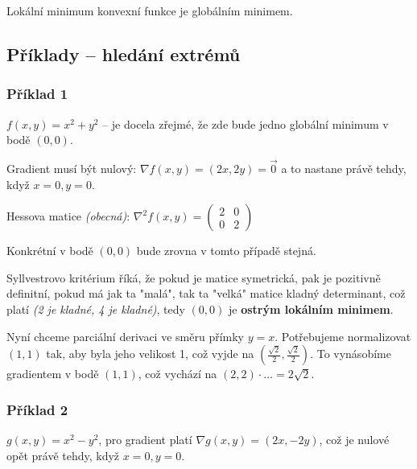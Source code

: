 \vspace{4pt}
\noindent Lokální minimum konvexní funkce je globálním minimem.

\subsection{Příklady -- hledání extrémů}

\subsubsection*{Příklad 1}

$f(x,y) = x^2 + y^2$ -- je docela zřejmé, že zde bude jedno globální minimum v bodě $(0,0)$.

\vspace{4pt}
\noindent Gradient musí být nulový: $\nabla f(x,y) = (2x, 2y) = \vec{0}$ a to nastane právě tehdy, když $x = 0, y = 0$.

\vspace{4pt}
\noindent 
Hessova matice \textit{(obecná)}: $\nabla^2 f(x, y) = \begin{pmatrix}
    2 & 0 \\
    0 & 2
\end{pmatrix}$

\vspace{6pt}
\noindent
Konkrétní v bodě $(0,0)$ bude zrovna v tomto případě stejná.

\vspace{6pt}
\noindent
Syllvestrovo kritérium říká, že pokud je matice symetrická, pak je pozitivně definitní, pokud má jak ta "malá", tak ta "velká" matice kladný determinant, což platí \textit{(2 je kladné, 4 je kladné)}, tedy $(0,0)$ je \textbf{ostrým lokálním minimem}.

\vspace{6pt}
\noindent
Nyní chceme parciální derivaci ve směru přímky $y = x$. Potřebujeme normalizovat $(1,1)$ tak, aby byla jeho velikost 1, což vyjde na $\left( \frac{\sqrt{2}}{2}, \frac{\sqrt{2}}{2} \right)$. To vynásobíme gradientem v bodě $(1,1)$, což vychází na $(2,2) \cdot \ldots = 2 \sqrt{2}$.

\subsubsection*{Příklad 2}

$g(x,y) = x^2 - y^2$, pro gradient platí $\nabla g(x, y) = (2x, -2y)$, což je nulové opět právě tehdy, když $x = 0, y = 0$.

